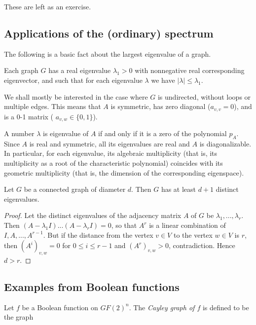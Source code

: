 These are left as an exercise.

\subsection{Applications of the (ordinary) spectrum}

The following is a basic fact about the largest eigenvalue of a graph.

\begin{theorem}
Each graph $G$ has a real eigenvalue $\lambda_1>0$ with nonnegative
real corresponding eigenvector, and such that for each
eigenvalue $\lambda$ we have $\vert \lambda \vert \le \lambda_1$.
\end{theorem}

We shall mostly be interested in the case where $G$ is undirected,
without loops or multiple edges. This means that $A$ is symmetric,
has zero diagonal ($a_{v,v} = 0$), and is a 0-1 matrix
( $a_{v,w} \in \{0,1\}$).

A number $\lambda$ is eigenvalue of $A$ if and only if it is a
zero of the polynomial $p_A$. Since $A$ is real and symmetric,
all its eigenvalues are real and $A$ is diagonalizable.
In particular, for each eigenvalue, its algebraic multiplicity
(that is, its multiplicity as a root of the characteristic
polynomial) coincides with its geometric multiplicity (that is, the
dimension of the corresponding eigenspace).

\begin{theorem}
Let $G$ be a connected graph of diameter $d$.
Then $G$ has at least $d + 1$ distinct eigenvalues.
\end{theorem}

\begin{proof}
Let the distinct eigenvalues of the adjacency matrix $A$ of
$G$ be $\lambda_1 , ... , \lambda_r$. Then
$(A - \lambda_1 I) ... (A - \lambda_r I) = 0$, so that
$A^r$ is a linear combination of $I, A, ... , A^{r-1}$.
But if the distance from the vertex $v\in V$ to the vertex $w\in V$ is
$r$, then $(A^i )_{v,w} = 0$ for $0 \le i \le r - 1$ and
$(A^r )_{v,w} > 0$, contradiction. Hence $d > r$.
\end{proof}

\subsection{Examples from Boolean functions}


Let $f$ be a Boolean function on $GF(2)^n$.
The {\it Cayley graph of $f$} is defined to be the graph

